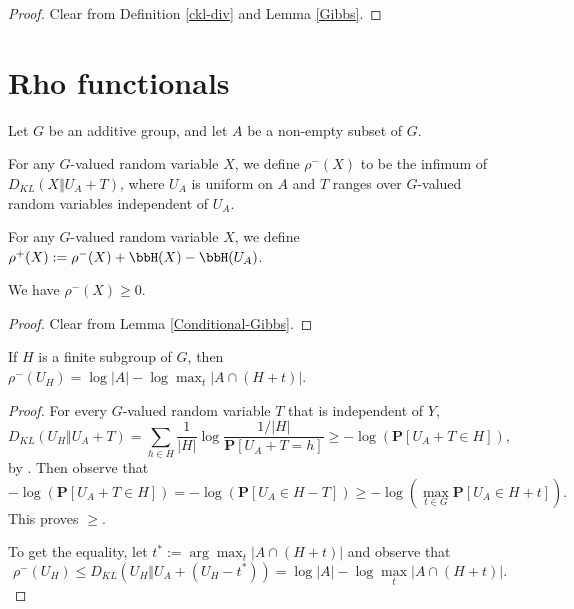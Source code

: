 \begin{proof}\leanok   Clear from Definition \ref{ckl-div} and Lemma \ref{Gibbs}.
\end{proof}

\section{Rho functionals}

Let $G$ be an additive group, and let $A$ be a non-empty subset of $G$.

\begin{definition}\label{rhominus-def}\leanok  For any $G$-valued random variable $X$, we define $\rho^-(X)$ to be the infimum of $D_{KL}(X \Vert  U_A + T)$, where $U_A$ is uniform on $A$ and $T$ ranges over $G$-valued random variables independent of $U_A$.
\end{definition}

\begin{definition}\label{rhoplus-def}\leanok  For any $G$-valued random variable $X$, we define $\rho^+(X) := \rho^-(X) + \bbH(X) - \bbH(U_A)$.
\end{definition}

\begin{lemma}\label{rhominus-nonneg}\label{rhoMinus_nonneg}\leanok  We have $\rho^-(X) \geq 0$.
\end{lemma}

\begin{proof}\leanok Clear from Lemma \ref{Conditional-Gibbs}.
\end{proof}

\begin{lemma}\label{rhominus-subgroup}\leanok If $H$ is a finite subgroup of $G$, then $\rho^-(U_H) = \log |A| - \log \max_t |A \cap (H+t)|$.
\end{lemma}

\begin{proof}\leanok
  For every $G$-valued random variable $T$ that is independent of $Y$,
  $$D_{KL}(U_H \Vert U_A+T) = \sum_{h\in H} \frac{1}{|H|}\log\frac{1/|H|}{\mathbf{P}[U_A+T=h]}\ge -\log(\mathbf{P}[U_A+T\in H]),$$
  by . Then observe that $$-\log(\mathbf{P}[U_A+T\in H])=-\log(\mathbf{P}[U_A\in H-T])\ge -\log(\max_{t\in G} \mathbf{P}[U_A\in H+t]).$$ This proves $\ge$.

  To get the equality, let $t^*:=\arg\max_t |A \cap (H+t)|$ and observe that $$\rho^-(U_H)\le D_{KL}(U_H \Vert  U_A+(U_H-t^*))= \log |A| - \log \max_t|A \cap (H+t)|.$$
\end{proof}


